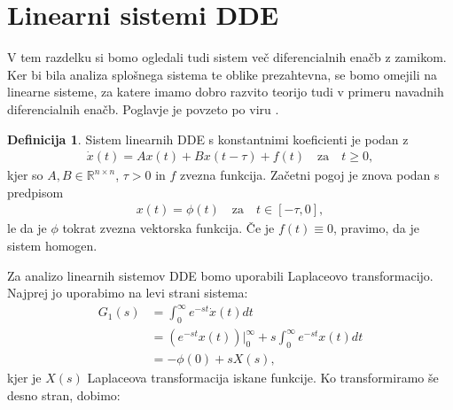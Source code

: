\documentclass[12pt,a4paper]{amsart}
\theoremstyle{definition} %
\newtheorem{definicija}{Definicija}[section]
\theoremstyle{plain} %
\newcommand{\R}{\mathbb R}
\begin{document}
\section{Linearni sistemi DDE}

V tem razdelku si bomo ogledali tudi sistem več diferencialnih enačb z zamikom. Ker bi bila analiza splošnega
sistema te oblike prezahtevna, se bomo omejili na linearne sisteme, za 
katere imamo dobro razvito teorijo tudi v primeru navadnih diferencialnih enačb. Poglavje je povzeto po viru 
\cite{angdiploma}.

\begin{definicija}
    Sistem linearnih DDE s konstantnimi koeficienti je podan z 
    \begin{equation} \label{eq5}
        \begin{split}
            \dot{x}(t)=Ax(t)+Bx(t-\tau)+f(t)\quad \text{za}\quad t\geq0,
        \end{split}
    \end{equation} kjer so
    $A,B\in\R^{n\times n}$, $\tau>0$ in $f$ zvezna funkcija. Začetni pogoj je znova podan s predpisom
    \begin{equation} \label{eq6}
        \begin{split}
            x(t)=\phi(t)\quad \text{za}\quad t\in [-\tau,0],
        \end{split}
    \end{equation}
    le da je $\phi$ tokrat zvezna vektorska funkcija. Če je $f(t)\equiv0$, pravimo,
    da je sistem homogen.
\end{definicija}
Za analizo linearnih sistemov DDE bomo uporabili Laplaceovo transformacijo. Najprej jo uporabimo na levi strani sistema:
\begin{equation*}
    \begin{split}
        G_1(s)&= \int_0^{\infty}e^{-st}\dot{x}(t)dt \\
            &= (e^{-st}x(t))\Bigr|_{0}^{\infty} + s\int_0^{\infty}e^{-st}x(t)dt \\
            &= -\phi(0) + sX(s),
    \end{split}      
\end{equation*}
kjer je $X(s)$ Laplaceova transformacija iskane funkcije.
Ko transformiramo še desno stran, dobimo:
\end{document}
